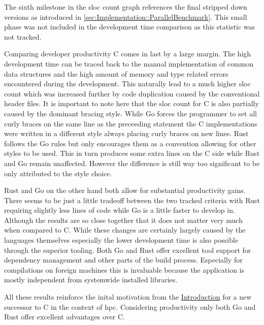The sixth milestone in the \gls{sloc} count graph references the final stripped down versions as introduced in \autoref{sec:Implementation::ParallelBenchmark}. This small phase was not included in the development time comparison as this statistic was not tracked.

Comparing developer productivity C comes in last by a large margin. The high development time can be traced back to the manual implementation of common data structures and the high amount of memory and type related errors encountered during the development. This naturally lead to a much higher \gls{sloc} count which was increased further by code duplication caused by the conventional header files. It is important to note here that the \gls{sloc} count for C is also partially caused by the dominant bracing style. While Go forces the programmer to set all curly braces on the same line as the preceeding statement the C implementations were written in a different style always placing curly braces on new lines. Rust follows the Go rules but only encourages them as a convention allowing for other styles to be used. This in turn produces some extra lines on the C side while Rust and Go remain unaffected. However the difference is still way too significant to be only attributed to the style choice.

Rust and Go on the other hand both allow for substantial productivity gains. There seems to be just a little tradeoff between the two tracked criteria with Rust requiring slightly less lines of code while Go is a little faster to develop in. Although the results are so close together that it does not matter very much when compared to C. While these changes are certainly largely caused by the languages themselves especially the lower development time is also possible through the superior tooling. Both Go and Rust offer excellent tool support for dependency management and other parts of the build process. Especially for compilations on foreign machines this is invaluable because the application is mostly independent from systemwide installed libraries.

All these results reinforce the inital motivation from the \hyperref[sec:Introduction::Motivation]{Introduction} for a new successor to C in the context of \acrlong{hpc}. Considering productivity only both Go and Rust offer excellent advantages over C.
